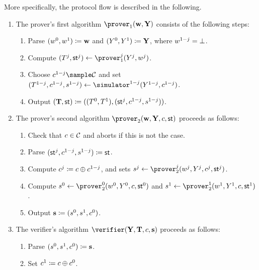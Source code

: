 \documentclass[runningheads,11pt]{article}
\begin{document}
	More specifically, the protocol flow is described in the following.
\begin{enumerate}
  \item
    The prover's first algorithm $\prover_1(\vec \witness, \vec \statement)$ consists of the following steps:
    \begin{enumerate}
      \item
        Parse $(w^0,w^1)\coloneqq \mathbf {w}$ and $(Y^0,Y^1)\coloneqq \mathbf {Y}$, where $w^{1-j}=\bot$.
      \item
        Compute $(\commitment^j,\st^j)\gets\prover_1^j(\statement^j,\witness^j)$.
      \item
        Choose $\challenge^{1-j}\sample\CS$ and set $(\commitment^{1-j},\challenge^{1-j},s^{1-j})\gets\simulator^{1-j}(\statement^{1-j},\challenge^{1-j})$.
      \item
	Output $(\mathbf {T},\mathsf{st}) \coloneqq ((T^0,T^1),(\mathsf{st}^j,c^{1-j},s^{1-j}))$.
    \end{enumerate}
  \item
    The prover's second algorithm $\prover_2(\vec \witness, \vec \statement,\challenge,\st)$ proceeds as follows:
    \begin{enumerate}
      \item
        Check that $c\in\mathcal{C}$ and aborts if this is not the case.
      \item Parse $(\mathsf{st}^j,c^{1-j},s^{1-j})\coloneqq\mathsf{st}$.
      \item
        Compute $c^j\coloneqq c\oplus c^{1-j}$, and sets $\response^j\gets\prover_2^j(\witness^j,\statement^j,\challenge^j,\st^j)$.
      \item
        Compute $s^0\gets\prover_2^0(\witness^0,\statement^0,\challenge,\st^0)$ and $s^1\gets\prover_2^1(\witness^1,\statement^1,\challenge,\st^1)$.
      \item
        Output $\mathbf {s}\coloneqq(s^0,s^1, c^0)$.
    \end{enumerate}
  \item
    The verifier's algorithm $\verifier(\vec \statement, \vec \commitment,\challenge,\vec \response)$ proceeds as follows:
    \begin{enumerate}
      \item
        Parse $(s^0, s^1, c^0)\coloneqq \mathbf {s}$.
      \item
        Set $c^1\coloneqq c \oplus c^0$.

\end{enumerate}
\end{enumerate}
\end{document}
